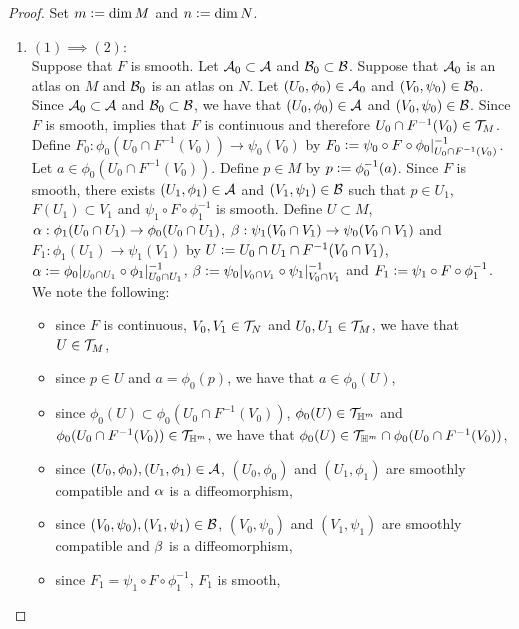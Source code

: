 \documentclass{book}
\begin{document}
\begin{proof} Set $m \vcentcolon= \dim M$ and $n \vcentcolon= \dim N$.
	\begin{enumerate}
		\item $(1) \implies (2)$: \\
		Suppose that $F$ is smooth. Let $\mathcal{A}_0 \subset \mathcal{A}$ and $\mathcal{B}_0 \subset \mathcal{B}$. Suppose that $\mathcal{A}_0$ is an atlas on $M$ and $\mathcal{B}_0$ is an atlas on $N$. Let $(U_0, \phi_0) \in \mathcal{A}_0$ and $(V_0, \psi_0) \in \mathcal{B}_0$. Since $\mathcal{A}_0 \subset \mathcal{A}$ and $\mathcal{B}_0 \subset \mathcal{B}$, we have that $(U_0, \phi_0) \in \mathcal{A}$ and $(V_0, \psi_0) \in \mathcal{B}$. Since $F$ is smooth,  implies that $F$ is continuous and therefore $U_0 \cap F^{-1}(V_0) \in \mathcal{T}_M$. Define $F_0:\phi_0(U_0 \cap F^{-1}(V_0)) \rightarrow \psi_0(V_0)$ by $F_0 \vcentcolon= \psi_0 \circ F \circ \phi_0|_{U_0 \cap F^{-1}(V_0)}^{-1}$. Let $a \in \phi_0(U_0 \cap F^{-1}(V_0))$. Define $p \in M$ by $p \vcentcolon= \phi_0^{-1}(a)$. Since $F$ is smooth, there exists $(U_1, \phi_1) \in \mathcal{A}$ and $(V_1, \psi_1) \in \mathcal{B}$ such that $p \in U_1$, $F(U_1) \subset V_1$ and $\psi_1 \circ F \circ \phi_1^{-1}$ is smooth. Define $U \subset M$, $\alpha: \phi_1(U_0 \cap U_1) \rightarrow \phi_0(U_0 \cap U_1)$, $\beta: \psi_1(V_0 \cap V_1) \rightarrow \psi_0(V_0 \cap V_1)$ and $F_1: \phi_1(U_1) \rightarrow \psi_1(V_1)$ by $U \vcentcolon= U_0 \cap U_1 \cap F^{-1}(V_0 \cap V_1)$, $\alpha \vcentcolon= \phi_0|_{U_0 \cap U_1} \circ \phi_1|_{U_0 \cap U_1}^{-1}$, $\beta \vcentcolon= \psi_0|_{V_0 \cap V_1} \circ \psi_1|_{V_0 \cap V_1}^{-1}$ and $F_1 \vcentcolon= \psi_1 \circ F \circ \phi_1^{-1}$.
		 We note the following:
		\begin{itemize}
			\item since $F$ is continuous, $V_0, V_1 \in \mathcal{T}_N$ and $U_0, U_1 \in \mathcal{T}_M$, we have that $U \in \mathcal{T}_M$,
			\item since $p \in U$ and $a = \phi_0(p)$, we have that $a \in \phi_0(U)$,
			\item since $\phi_0(U) \subset \phi_0(U_0 \cap F^{-1}(V_0))$, $\phi_0(U) \in \mathcal{T}_{\mathbb{H}^m}$ and $\phi_0(U_0 \cap F^{-1}(V_0)) \in \mathcal{T}_{\mathbb{H}^m}$, we have that $\phi_0(U) \in \mathcal{T}_{\mathbb{H}^m} \cap \phi_0(U_0 \cap F^{-1}(V_0))$,
			\item since $(U_0, \phi_0), (U_1, \phi_1) \in \mathcal{A}$, $(U_0, \phi_0)$ and $(U_1, \phi_1)$ are smoothly compatible and $\alpha$ is a diffeomorphism,
			\item since $(V_0, \psi_0), (V_1, \psi_1) \in \mathcal{B}$, $(V_0, \psi_0)$ and $(V_1, \psi_1)$ are smoothly compatible and $\beta$ is a diffeomorphism,
			\item since $F_1 = \psi_1 \circ F \circ \phi_1^{-1}$, $F_1$ is smooth,

\end{itemize}
\end{enumerate}
\end{proof}
\end{document}
